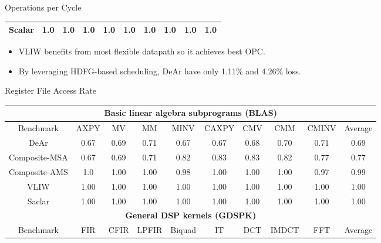 \documentclass{beamer}
\begin{document}
\begin{CJK}{UTF8}{bkai}
\begin{frame}{Operations per Cycle}
\begin{table}[!ht]
{\begin{tabular}{|c|c|c|c|c|c|c|c|c|c|}
                    Scalar  & 1.0  & 1.0  & 1.0  & 1.0  & 1.0  & 1.0  & 1.0  & 1.0  & 1.0 \\ \hline 
                \end{tabular}
            }
        \end{table}
        \begin{itemize}
            \item VLIW benefits from most flexible datapath so it achieves best OPC.
            \item By leveraging HDFG-based scheduling, DeAr have only 1.11\% and 4.26\% loss.
        \end{itemize}

    \end{frame}

    \begin{frame}{Register File Access Rate}
        \begin{table}[!ht]
            \centering
            \resizebox{\columnwidth}{!}
            {
                \begin{tabular}{|c|c|c|c|c|c|c|c|c|c|}
                    \hline
                    \multicolumn{10}{|c|}{\textbf{Basic linear algebra subprograms (BLAS)}} \\ \hline
                    Benchmark  &  AXPY  &  MV  &  MM  &  MINV  &  CAXPY  &  CMV  &  CMM  &  CMINV  &  Average \\ \hline 
                    DeAr  &   0.67  &   0.69  &   0.71  &   0.67  &   0.67  &   0.68  &   0.70  &   0.71  &   0.69     \\ \hline
                    Composite-MSA  &   0.67  &   0.69  &  0.71  &   0.82  &   0.83  &   0.83  &   0.82  &   0.77  &  0.77     \\ \hline 
                    Composite-AMS  &   1.0  &   1.00  &   1.00  &   0.98  &   1.00  &   1.00  &   1.00  &   0.97  &   0.99     \\ \hline 
                    VLIW  &   1.00  &   1.00  &   1.00  &   1.00  &   1.00  &   1.00  &   1.00  &   1.00  &   1.00     \\ \hline 
                    Saclar  &   1.00  &   1.00  &   1.00  &   1.00  &   1.00  &   1.00  &   1.00  &   1.00  &   1.00     \\ \hline 
                    \multicolumn{10}{|c|}{\textbf{General DSP kernels (GDSPK)}}                     \\ \hline
                    Benchmark  &  FIR  &  CFIR  &  LPFIR  &  Biquad  &  IT  &  DCT  &  IMDCT  &  FFT  &  Average \\ \hline 

\end{tabular}}
\end{table}
\end{frame}
\end{CJK}
\end{document}
